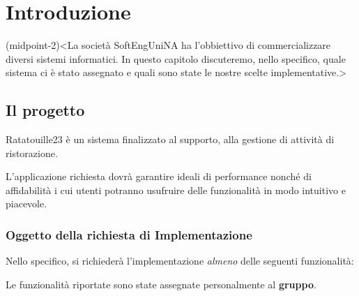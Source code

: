 \chapter{Introduzione}(midpoint-2)<La società SoftEngUniNA ha l'obbiettivo di commercializzare diversi sistemi informatici. In questo capitolo discuteremo, nello specifico, quale sistema ci è stato assegnato e quali sono state le nostre scelte implementative.>

\section{Il progetto}
Ratatouille23 è un sistema finalizzato al supporto, alla gestione di attività di ristorazione. 

L'applicazione richiesta dovrà garantire ideali di performance nonché di affidabilità i cui utenti
potranno usufruire delle funzionalità in modo intuitivo e piacevole.

\subsection{Oggetto della richiesta di Implementazione}
Nello specifico, si richiederà l'implementazione \textit{almeno} delle seguenti
funzionalità:

\begin{chapterbox}
	Le funzionalità riportate sono state assegnate personalmente al \textbf{gruppo}.
\end{chapterbox}

